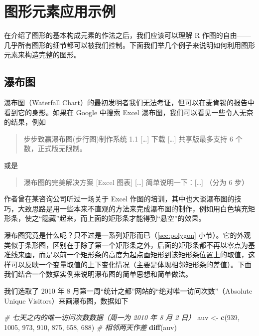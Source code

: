 \documentclass[
  b5paper,
  UTF8,twoside]{book}
\newenvironment{Shaded}{\begin{snugshade}}{\end{snugshade}}
\newcommand{\CommentTok}[1]{\textcolor[rgb]{0.56,0.35,0.01}{\textit{#1}}}
\newcommand{\DecValTok}[1]{\textcolor[rgb]{0.00,0.00,0.81}{#1}}
\newcommand{\FunctionTok}[1]{\textcolor[rgb]{0.13,0.29,0.53}{\textbf{#1}}}
\newcommand{\NormalTok}[1]{#1}
\newcommand{\OtherTok}[1]{\textcolor[rgb]{0.56,0.35,0.01}{#1}}
\begin{document}
\section{图形元素应用示例}\label{ux56feux5f62ux5143ux7d20ux5e94ux7528ux793aux4f8b}

在介绍了图形的基本构成元素的作法之后，我们应该可以理解 R 作图的自由------几乎所有图形的细节都可以被我们控制。下面我们举几个例子来说明如何利用图形元素来构造完整的图形。

\subsection{瀑布图}\label{subsec:waterfall-chart}

瀑布图（Waterfall Chart）的最初发明者我们无法考证，但可以在麦肯锡的报告中看到它的身影。如果在 Google 中搜索 Excel 瀑布图，我们可以看见一些令人无奈的结果，例如

\begin{quote}
步步致赢瀑布图(步行图)制作系统 1.1 {[}\ldots{]} 下载 {[}\ldots{]} 共享版最多支持 6 个数，正式版无限制。
\end{quote}

或是

\begin{quote}
瀑布图的完美解决方案 {[}Excel 图表{]} {[}\ldots{]} 简单说明一下：{[}\ldots{]} （分为 6 步）
\end{quote}

作者曾在某咨询公司听过一场关于 Excel 作图的培训，其中也大谈瀑布图的技巧，大致思路是用一些本来不直观的方法来完成瀑布图的制作，例如用白色填充矩形条，使之``隐藏''起来，而上面的矩形条才能得到``悬空''的效果。

瀑布图究竟是什么呢？只不过是一系列矩形而已（\ref{sec:polygon} 小节）。它的外观类似于条形图，区别在于除了第一个矩形条之外，后面的矩形条都不再以零点为基准线来画，而是以前一个矩形条的高度为起点画矩形到该矩形条位置上的取值，这样可以反映一个变量取值的上下变化情况（主要是体现相邻矩形条的差值）。下面我们结合一个数据实例来说明瀑布图的简单思想和简单做法。

我们选取了 2010 年 8 月第一周``统计之都''网站的``绝对唯一访问次数''（Absolute Unique Visitors）来画瀑布图，数据如下

\begin{Shaded}
\begin{Highlighting}[]
\CommentTok{\# 七天之内的唯一访问次数数据（周一为 2010 年 8 月 2 日）}
\NormalTok{auv }\OtherTok{\textless{}{-}} \FunctionTok{c}\NormalTok{(}\DecValTok{939}\NormalTok{, }\DecValTok{1005}\NormalTok{, }\DecValTok{973}\NormalTok{, }\DecValTok{910}\NormalTok{, }\DecValTok{875}\NormalTok{, }\DecValTok{658}\NormalTok{, }\DecValTok{688}\NormalTok{)}
\CommentTok{\# 相邻两天作差}
\FunctionTok{diff}\NormalTok{(auv)}
\end{Highlighting}
\end{Shaded}
\end{document}
